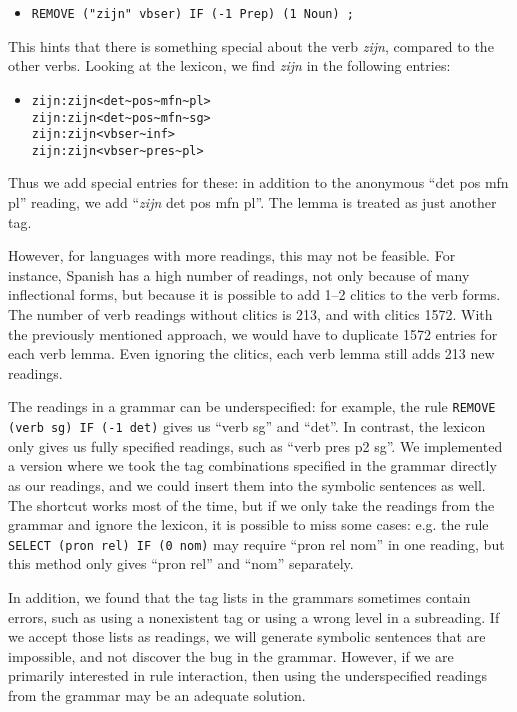 {{\begin{itemize}
 \item[] \texttt{REMOVE ("zijn" vbser) IF (-1 Prep) (1 Noun) ;}
\end{itemize}

This hints that there is something special about the verb \emph{zijn}, compared to the other verbs. Looking at the lexicon, we find \emph{zijn} in the following entries:

\begin{itemize}
 \item[] 
\begin{verbatim}zijn:zijn<det~pos~mfn~pl>
zijn:zijn<det~pos~mfn~sg>
zijn:zijn<vbser~inf>
zijn:zijn<vbser~pres~pl>
\end{verbatim}
\end{itemize}

Thus we add special entries for these: in addition to the anonymous
``det pos mfn pl'' reading, we add ``\emph{zijn} det pos mfn pl''. 
The lemma is treated as just another tag.

 However, for languages with more readings, this may not be feasible. For instance, Spanish has a high number of readings, not only because of many inflectional forms, but because it is possible to add 1--2 clitics to the verb forms.
The number of verb readings without clitics is 213, and with clitics 1572.
With the previously mentioned approach, we would have to duplicate 1572 entries for each verb lemma. Even ignoring the clitics, each verb lemma still adds 213 new readings.

The readings in a grammar can be underspecified: for example, the rule
\texttt{REMOVE (verb sg) IF (-1 det)} gives us ``verb sg'' and ``det''.
In contrast, the lexicon only gives us fully specified readings, such
as ``verb pres p2 sg''. We implemented a version where we took
the tag combinations specified in the grammar directly as our
readings, and we could insert them into the symbolic sentences as well.
The shortcut works most of the time, but if we only take the readings
from the grammar and ignore the lexicon, it is possible to
miss some cases: e.g. the rule \texttt{SELECT (pron rel) IF (0 nom)} 
may require ``pron rel nom'' in one reading, but this method only gives
``pron rel'' and ``nom'' separately. 


In addition, we found that the tag lists in the grammars sometimes
contain errors, such as using a nonexistent tag or using a wrong level
in a subreading. If we accept those lists as readings, we will
generate symbolic sentences that are impossible, and not discover
the bug in the grammar.
However, if we are primarily interested in rule interaction, then using
the underspecified readings from the grammar may be an adequate solution.

}}
